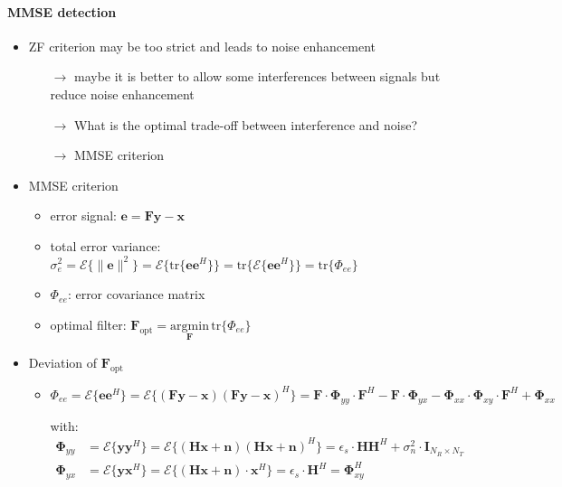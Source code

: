 \documentclass[a4paper, 10pt]{article}
\begin{document}
\paragraph{MMSE detection}
\begin{itemize}
\item ZF criterion may be too strict and leads to noise enhancement
	\begin{itemize}
		\item[$\rightarrow$] maybe it is better to allow some interferences between signals but reduce noise enhancement
		\item[$\rightarrow$] What is the optimal trade-off between interference and noise?
		\item[$\rightarrow$] MMSE criterion
	\end{itemize}
\item MMSE criterion 
	\begin{itemize}
		\item error signal: $ \mathbf{e} = \mathbf{Fy} - \mathbf{x} $
		\item total error variance: $\sigma_e^2 = \mathcal{E}\bigl \{ \| \mathbf{e}\| ^2\bigr\} = \mathcal{E}\bigl \{\text{tr}\{\mathbf{ee}^H\} \bigr\} = \text{tr}\bigl\{\mathcal{E}\{\mathbf{ee}^H\}\bigr\} = \text{tr}\{ \Phi_{ee}\}$ 
		\item $\Phi_{ee}$: error covariance matrix
		\item optimal filter: $\mathbf{F}_{\text{opt}} = \underset{\mathbf{F}}{\mathrm{argmin}}\,\mathrm{tr}\{\Phi_{ee}\} $
	\end{itemize}
	\item Deviation of $\mathbf{F}_{\text{opt}}$
	\begin{itemize}
		\item $\Phi_{ee}= \mathcal{E}\{\mathbf{ee}^H\} = \mathcal{E}\{(\mathbf{Fy} - \mathbf{x})(\mathbf{Fy} - \mathbf{x})^H \} = \mathbf{F}\cdot\boldsymbol{\Phi}_{yy}\cdot\mathbf{F}^H - \mathbf{F}\cdot\boldsymbol{\Phi}_{yx} - \boldsymbol{\Phi}_{xx}\cdot\boldsymbol{\Phi}_{xy}\cdot\mathbf{F}^H + \boldsymbol{\Phi}_{xx} $
		\item[] with:
		\begin{align*}
			\boldsymbol{\Phi}_{yy} &= \mathcal{E}\{ \mathbf{yy}^H\} = \mathcal{E}\{(\mathbf{Hx} + \mathbf{n})(\mathbf{Hx} + \mathbf{n})^H\} = \epsilon_s \cdot\mathbf{H}\mathbf{H}^H + \sigma_n^2\cdot\mathbf{I}_{N_R\times N_T}\\
			\boldsymbol{\Phi}_{yx} &= \mathcal{E}\{ \mathbf{yx}^H\} = \mathcal{E}\{ (\mathbf{Hx} + \mathbf{n})\cdot\mathbf{x}^H\} = \epsilon_s\cdot\mathbf{H}^H = \boldsymbol{\Phi}_{xy}^H\\

\end{align*}
\end{itemize}
\end{itemize}
\end{document}
